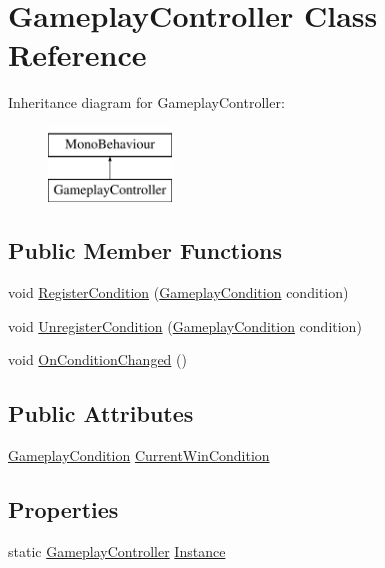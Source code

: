 \hypertarget{class_gameplay_controller}{}\section{Gameplay\+Controller Class Reference}
\label{class_gameplay_controller}
Inheritance diagram for Gameplay\+Controller\+:\begin{figure}[H]
\begin{center}
\leavevmode
\includegraphics[height=2.000000cm]{class_gameplay_controller}
\end{center}
\end{figure}
\subsection*{Public Member Functions}
\begin{DoxyCompactItemize}
\item 
void \mbox{\hyperlink{class_gameplay_controller_abb7793cefa2ef8e6ccf602755a1b4c60}{Register\+Condition}} (\mbox{\hyperlink{class_gameplay_condition}{Gameplay\+Condition}} condition)
\item 
void \mbox{\hyperlink{class_gameplay_controller_aec5100ce654fbef3c650d9a404b6f684}{Unregister\+Condition}} (\mbox{\hyperlink{class_gameplay_condition}{Gameplay\+Condition}} condition)
\item 
void \mbox{\hyperlink{class_gameplay_controller_ad54b80a1e76c02f2c09652f2700189bf}{On\+Condition\+Changed}} ()
\end{DoxyCompactItemize}
\subsection*{Public Attributes}
\begin{DoxyCompactItemize}
\item 
\mbox{\hyperlink{class_gameplay_condition}{Gameplay\+Condition}} \mbox{\hyperlink{class_gameplay_controller_ad705d003de8ec360b4c215e244f6b3d0}{Current\+Win\+Condition}}
\end{DoxyCompactItemize}
\subsection*{Properties}
\begin{DoxyCompactItemize}
\item 
static \mbox{\hyperlink{class_gameplay_controller}{Gameplay\+Controller}} \mbox{\hyperlink{class_gameplay_controller_a0bb024792ce1b463dbcba91fc99b7533}{Instance}}
\end{DoxyCompactItemize}


